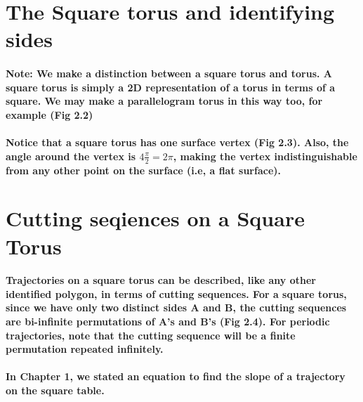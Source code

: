 \documentclass{report}
\begin{document}
\section{The Square torus and identifying sides}



\paragraph{Note: We make a distinction between a square torus and  torus. A square torus is simply a 2D representation of a torus in terms of a square. We may make a parallelogram torus in this way too, for example (Fig 2.2)
}


\paragraph{Notice that a square torus has one surface vertex (Fig 2.3). Also, the angle around the vertex is $4\frac{\pi}{2} = 2\pi$, making the vertex indistinguishable from any other point on the surface (i.e, a flat surface).}


\section{Cutting seqiences on a Square Torus}

\paragraph{Trajectories on a square torus can be described, like any other identified polygon, in terms of cutting sequences. For a square torus, since we have only two distinct sides A and B, the cutting sequences are bi-infinite permutations of A’s and B’s (Fig 2.4). For periodic trajectories, note that the cutting sequence will be a finite permutation repeated infinitely.}


\paragraph{In Chapter 1, we stated an equation to find the slope of a trajectory on the square table.}
\end{document}
